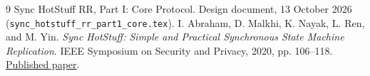 \documentclass[11pt,a4paper]{article}
\begin{document}
\begingroup\small
\begin{thebibliography}{9}
Sync HotStuff RR, Part I: Core Protocol. Design document, 13 October 2026
(\texttt{sync\_hotstuff\_rr\_part1\_core.tex}).
I. Abraham, D. Malkhi, K. Nayak, L. Ren, and M. Yin.
\emph{Sync HotStuff: Simple and Practical Synchronous State Machine Replication}.
IEEE Symposium on Security and Privacy, 2020, pp. 106--118.
\href{https://conferences.computer.org/sp/pdfs/sp/2020/349700a106.pdf}{Published paper}.
\end{thebibliography}
\endgroup
\end{document}
